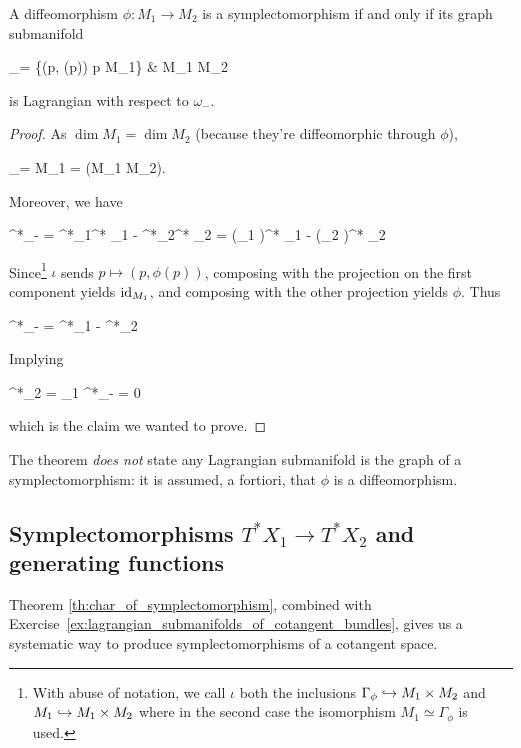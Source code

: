 \documentclass[main.tex]{subfiles}
\begin{document}
\begin{theorem}
\label{th:char_of_symplectomorphism}
	A diffeomorphism $\phi : M_1 \to M_2$ is a symplectomorphism if and only if its graph submanifold
	\begin{diagram}
		\Gamma_\phi = \{(p, \phi(p)) \suchthat p \in M_1\}  \& M_1 \times M_2
	\end{diagram}
	is Lagrangian with respect to $\omega_-$.
\end{theorem}
\begin{proof}
	As $\dim M_1 = \dim M_2$ (because they're diffeomorphic through $\phi$),
	\begin{eqalign}
		\dim \Gamma_\phi = \dim M_1 =  \dim (M_1 \times M_2).
	\end{eqalign}
	Moreover, we have
	\begin{eqalign}
		\iota^*\omega_- = \iota^*\pr_1^* \omega_1 - \iota^*\pr_2^* \omega_2 = (\pr_1 \circ \iota)^* \omega_1 - (\pr_2 \circ \iota)^* \omega_2
	\end{eqalign}
	Since\footnote{With abuse of notation, we call $\iota$ both the inclusions $\Gamma_\phi \hookrightarrow M_1 \times M_2$ and $M_1 \hookrightarrow M_1 \times M_2$ where in the second case the isomorphism $M_1 \simeq \Gamma_\phi$ is used. } $\iota$ sends $p \mapsto (p,\phi(p))$, composing with the projection on the first component yields $\mathrm{id}_{M_1}$, and composing with the other projection yields $\phi$. Thus
	\begin{eqalign}
		\iota^*\omega_- = \id^*\omega_1 - \phi^*\omega_2
	\end{eqalign}
	Implying
	\begin{eqalign}
		\phi^*\omega_2 = \omega_1 \iff \iota^*\omega_- = 0
	\end{eqalign}
	which is the claim we wanted to prove.
\end{proof}

\begin{remark}
	The theorem \emph{does not} state any Lagrangian submanifold is the graph of a symplectomorphism: it is assumed, a fortiori, that $\phi$ is a diffeomorphism.
\end{remark}

\subsection{Symplectomorphisms $T^*X_1 \to T^*X_2$ and generating functions}
Theorem \ref{th:char_of_symplectomorphism}, combined with Exercise~\ref{ex:lagrangian_submanifolds_of_cotangent_bundles}, gives us a systematic way to produce symplectomorphisms of a cotangent space.
\end{document}
